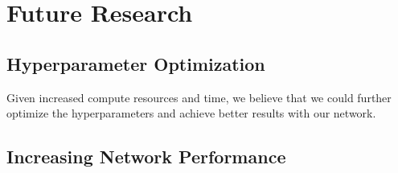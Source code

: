 \chapter{Future Research}\label{chap:future}
\section{Hyperparameter Optimization}\label{chap:future-Hyperparameter}
Given increased compute resources and time, we believe that we could further optimize the hyperparameters and achieve better results with our network.

\section{Increasing Network Performance}